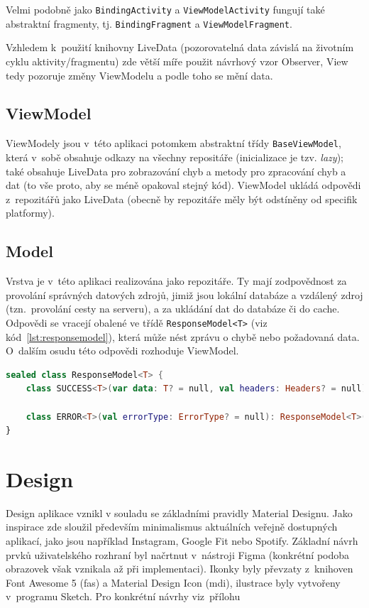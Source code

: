 \documentclass[twoside]{ctuthesis}
\begin{document}
\begin{enumerate}[label=\textbf{O\arabic*.}]
Velmi podobně jako \texttt{BindingActivity} a \texttt{ViewModelActivity} fungují také abstraktní fragmenty, tj. \texttt{BindingFragment} a \texttt{ViewModelFragment}.

Vzhledem k~použití knihovny LiveData (pozorovatelná data závislá na životním cyklu aktivity/fragmentu) zde větší míře použit návrhový vzor Observer, View tedy pozoruje změny ViewModelu a podle toho se mění data.

\subsection{ViewModel}

ViewModely jsou v~této aplikaci potomkem abstraktní třídy \texttt{BaseViewModel}, která v~sobě obsahuje odkazy na všechny repositáře (inicializace je tzv. \textit{lazy}); také obsahuje LiveData pro zobrazování chyb a metody pro zpracování chyb a dat (to vše proto, aby se méně opakoval stejný kód). ViewModel ukládá odpovědi z~repozitářů jako LiveData (obecně by repozitáře měly být odstíněny od specifik platformy).

\subsection{Model}

Vrstva je v~této aplikaci realizována jako repozitáře. Ty mají zodpovědnost za provolání správných datových zdrojů, jimiž jsou lokální databáze a vzdálený zdroj (tzn.~provolání cesty na serveru), a za ukládání dat do databáze či do cache. Odpovědi se vracejí obalené ve třídě \texttt{ResponseModel<T>} (viz kód~\ref{lst:responsemodel}), která může nést zprávu o chybě nebo požadovaná data. O~dalším osudu této odpovědi rozhoduje ViewModel.

\begin{lstlisting}[language=Kotlin,caption={Třída \texttt{ResponseModel}},label={lst:responsemodel}]
sealed class ResponseModel<T> {
	class SUCCESS<T>(var data: T? = null, val headers: Headers? = null): ResponseModel<T>()

	class ERROR<T>(val errorType: ErrorType? = null): ResponseModel<T>()
}
\end{lstlisting}

\section{Design}\label{design}

Design aplikace vznikl v souladu se základními pravidly Material Designu. Jako inspirace zde sloužil především minimalismus aktuálních veřejně dos\-tup\-ných aplikací, jako jsou například Instagram, Google Fit nebo Spotify. Základní návrh prvků uživatelského rozhraní byl načrtnut v~nástroji Figma (konkrétní podoba obrazovek však vznikala až při implementaci). Ikonky byly převzaty z~knihoven Font Awesome 5 (fas) a Material Design Icon (mdi), ilustrace byly vytvořeny v~programu Sketch. Pro konkrétní návrhy viz~přílohu 


\end{enumerate}
\end{document}
